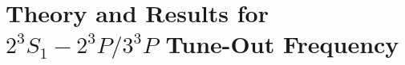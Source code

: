 \documentclass[%
 amsmath,amssymb,
aps,
]{revtex4-2}
\newcommand{\MetastableState}{2^{3\!}S_1}%
\newcommand{\UpperStateManifold}{3^{3\!}P}%
\newcommand{\LowerStateManifold}{2^{3\!}P}%
\newcommand{\TO}{\MetastableState- \LowerStateManifold / \UpperStateManifold}%
\begin{document}





\section{Theory and Results for \(\TO\) Tune-Out Frequency}
\end{document}

